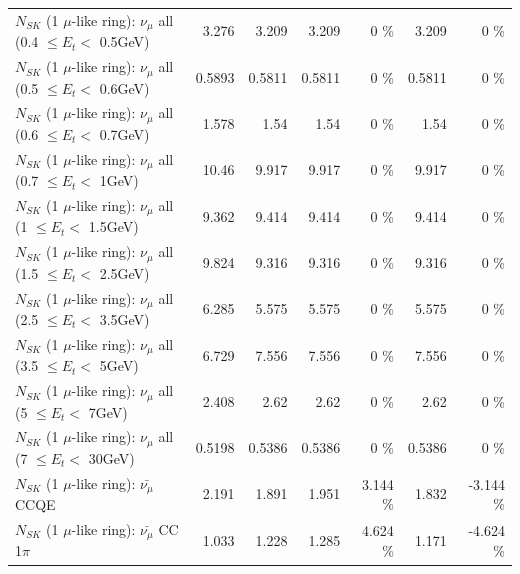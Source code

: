 \begin{table}
\begin{tabular}{| l | r | r | r  r | r  r |}
       $N_{SK}$ (1 $\mu$-like ring): $\nu_{\mu}$ all (0.4 $\leq E_{t} <$ 0.5GeV) &           3.276 &           3.209 &           3.209 &        0 \%  &           3.209 &        0 \%  \\ 
       $N_{SK}$ (1 $\mu$-like ring): $\nu_{\mu}$ all (0.5 $\leq E_{t} <$ 0.6GeV) &          0.5893 &          0.5811 &          0.5811 &        0 \%  &          0.5811 &        0 \%  \\ 
       $N_{SK}$ (1 $\mu$-like ring): $\nu_{\mu}$ all (0.6 $\leq E_{t} <$ 0.7GeV) &           1.578 &            1.54 &            1.54 &        0 \%  &            1.54 &        0 \%  \\ 
         $N_{SK}$ (1 $\mu$-like ring): $\nu_{\mu}$ all (0.7 $\leq E_{t} <$ 1GeV) &           10.46 &           9.917 &           9.917 &        0 \%  &           9.917 &        0 \%  \\ 
         $N_{SK}$ (1 $\mu$-like ring): $\nu_{\mu}$ all (1 $\leq E_{t} <$ 1.5GeV) &           9.362 &           9.414 &           9.414 &        0 \%  &           9.414 &        0 \%  \\ 
       $N_{SK}$ (1 $\mu$-like ring): $\nu_{\mu}$ all (1.5 $\leq E_{t} <$ 2.5GeV) &           9.824 &           9.316 &           9.316 &        0 \%  &           9.316 &        0 \%  \\ 
       $N_{SK}$ (1 $\mu$-like ring): $\nu_{\mu}$ all (2.5 $\leq E_{t} <$ 3.5GeV) &           6.285 &           5.575 &           5.575 &        0 \%  &           5.575 &        0 \%  \\ 
         $N_{SK}$ (1 $\mu$-like ring): $\nu_{\mu}$ all (3.5 $\leq E_{t} <$ 5GeV) &           6.729 &           7.556 &           7.556 &        0 \%  &           7.556 &        0 \%  \\ 
           $N_{SK}$ (1 $\mu$-like ring): $\nu_{\mu}$ all (5 $\leq E_{t} <$ 7GeV) &           2.408 &            2.62 &            2.62 &        0 \%  &            2.62 &        0 \%  \\ 
          $N_{SK}$ (1 $\mu$-like ring): $\nu_{\mu}$ all (7 $\leq E_{t} <$ 30GeV) &          0.5198 &          0.5386 &          0.5386 &        0 \%  &          0.5386 &        0 \%  \\ 
\hline
\hline
\hline
                              $N_{SK}$ (1 $\mu$-like ring): $\bar{\nu_\mu}$ CCQE &           2.191 &           1.891 &           1.951 &    3.144 \%  &           1.832 &   -3.144 \%  \\ 
                         $N_{SK}$ (1 $\mu$-like ring): $\bar{\nu_\mu}$ CC 1$\pi$ &           1.033 &           1.228 &           1.285 &    4.624 \%  &           1.171 &   -4.624 \%  \\ 

\end{tabular}
\end{table}
